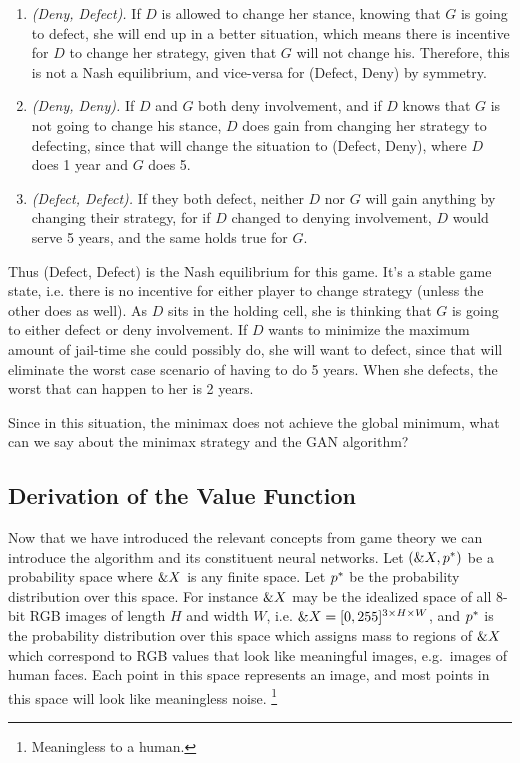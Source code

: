 \begin{enumerate}
\item \textit{(Deny, Defect).} If $D$ is allowed to change her stance,
  knowing that $G$ is going to defect, she will end up in a better
  situation, which means there is incentive for $D$ to change her
  strategy, given that $G$ will not change his. Therefore, this is not
  a Nash equilibrium, and vice-versa for (Defect, Deny) by symmetry.
\item \textit{(Deny, Deny).} If $D$ and $G$ both deny involvement, and
  if $D$ knows that $G$ is not going to change his stance, $D$ does
  gain from changing her strategy to defecting, since that will change
  the situation to (Defect, Deny), where $D$ does 1 year and $G$ does
  5.
\item \textit{(Defect, Defect).} If they both defect, neither $D$ nor
  $G$ will gain anything by changing their strategy, for if $D$
  changed to denying involvement, $D$ would serve 5 years, and the same
  holds true for $G$.
\end{enumerate}

Thus (Defect, Defect) is the Nash equilibrium for this game. It's a
stable game state, i.e. there is no incentive for either player to
change strategy (unless the other does as well). As $D$ sits in the
holding cell, she is thinking that $G$ is going to either defect or
deny involvement. If $D$ wants to minimize the maximum amount of
jail-time she could possibly do, she will want to defect, since that
will eliminate the worst case scenario of having to do 5 years. When
she defects, the worst that can happen to her is 2 years.

Since in this situation, the minimax does not achieve the global
minimum, what can we say about the minimax strategy and the GAN
algorithm?

\subsection{Derivation of the Value Function}
\label{sec:derivation}

Now that we have introduced the relevant concepts from game theory we
can introduce the algorithm and its constituent neural networks. Let
$(\&X, p^*)$ be a probability space where $\&X$ is any finite
space. Let $p^*$ be the probability distribution over this space. For
instance $\&X$ may be the idealized space of all 8-bit RGB images
of length $H$ and width $W$, i.e.
$\&X = [0, 255]^{3 \times H \times W}$, and $p^*$ is the
probability distribution over this space which assigns mass to regions
of $\&X$ which correspond to RGB values that look like meaningful
images, e.g.\ images of human faces. Each point in this space
represents an image, and most points in this space will look like
meaningless noise. \footnote{Meaningless to a human.}

